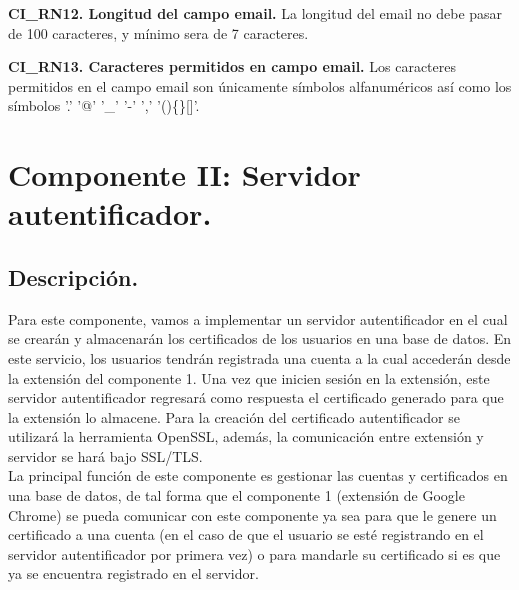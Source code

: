 \documentclass[12pt, a4paper, titlepage]{report}
\begin{document}
			\textbf{CI\_RN12. Longitud del campo email.}
			La longitud del email no debe pasar de 100 caracteres, y mínimo sera de 7 caracteres.\\
			\label{CI_RN12}
			
			\textbf{CI\_RN13. Caracteres permitidos en campo email.}
			Los caracteres permitidos en el campo email son únicamente símbolos alfanuméricos así como los símbolos '.' '@' '\_' '-' ',' '()\{\}[]'.\\
			\label{CI_RN13}
				
	        
	   \section{Componente II: Servidor autentificador.}
	        \subsection{Descripción.}
	        Para este componente, vamos a implementar un servidor autentificador en el cual se crearán y almacenarán los certificados de los usuarios en una base de datos. En este servicio, los usuarios tendrán registrada una cuenta a la cual accederán desde la extensión del componente 1. Una vez que inicien sesión en la extensión, este servidor autentificador regresará como respuesta el certificado generado para que la extensión lo almacene. Para la creación del certificado autentificador se utilizará la herramienta OpenSSL, además, la comunicación entre extensión y servidor se hará bajo SSL/TLS.\\
	        
	        La principal función de este componente es gestionar las cuentas y certificados en una base de datos, de tal forma que el componente 1 (extensión de Google Chrome) se pueda comunicar con este componente ya sea para que le genere un certificado a una cuenta (en el caso de que el usuario se esté registrando en el servidor autentificador por primera vez) o para mandarle su certificado si es que ya se encuentra registrado en el servidor.\\
	        
\end{document}
